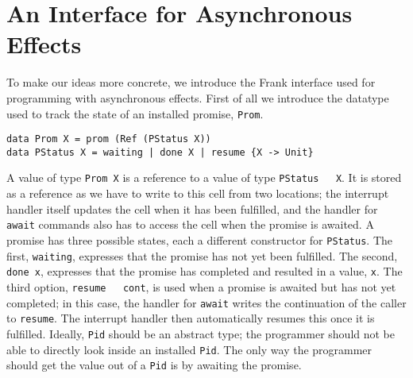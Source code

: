 \documentclass[msc,deptreport,cs]{infthesis} %
\newcommand{\code}[1]{\lstinline{#1}}
\newcommand{\todo}[1]
           {{\par\noindent\small\color{RoyalPurple}
  \framebox{\parbox{\dimexpr\linewidth-2\fboxsep-2\fboxrule}
    {\textbf{TODO:} #1}}}}
\begin{document}
\todo{Fix this?}





\section{An Interface for Asynchronous Effects}

To make our ideas more concrete, we introduce the Frank interface used for
programming with asynchronous effects. First of all we introduce the datatype
used to track the state of an installed promise, \code{Prom}.

\begin{lstlisting}
data Prom X = prom (Ref (PStatus X))
data PStatus X = waiting | done X | resume {X -> Unit}
\end{lstlisting}

A value of type \code{Prom X} is a reference to a value of type \code{PStatus
  X}. It is stored as a reference as we have to write to this cell from two
locations; the interrupt handler itself updates the cell when it has been
fulfilled, and the handler for \code{await} commands also has to access the cell
when the promise is awaited.
%
A promise has three possible states, each a different constructor for
\code{PStatus}. The first, \code{waiting}, expresses that the promise has not
yet been fulfilled. The second, \code{done x}, expresses that the promise has
completed and resulted in a value, \code{x}. The third option, \code{resume
  cont}, is used when a promise is awaited but has not yet completed; in this
case, the handler for \code{await} writes the continuation of the caller to
\code{resume}. The interrupt handler then automatically resumes this once it is
fulfilled. Ideally, \code{Pid} should be an abstract type; the programmer should
not be able to directly look inside an installed \code{Pid}. The only way the
programmer should get the value out of a \code{Pid} is by awaiting the promise.

\end{document}
